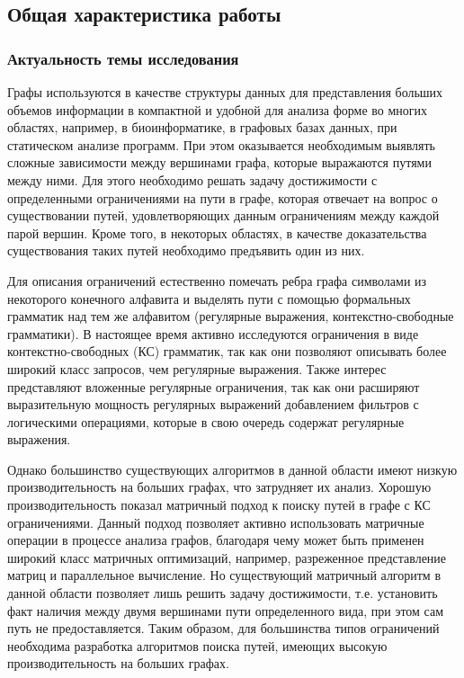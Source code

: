 \subsection*{\Large Общая характеристика работы}
\fontsize{14pt}{15pt}\selectfont
\subsubsection*{\large{Актуальность темы исследования}}
Графы используются в качестве структуры данных для представления больших объемов информации в компактной и удобной для анализа форме во многих областях, например, в биоинформатике, в графовых базах данных, при статическом анализе программ. При этом оказывается необходимым выявлять сложные зависимости между вершинами графа, которые выражаются путями между ними. Для этого необходимо решать задачу достижимости с определенными ограничениями на пути в графе, которая отвечает на вопрос о существовании путей, удовлетворяющих данным ограничениям между каждой парой вершин. Кроме того, в некоторых областях, в качестве доказательства существования таких путей необходимо предъявить один из них. 


Для описания ограничений естественно помечать ребра графа символами из некоторого конечного алфавита и выделять пути с помощью формальных грамматик над тем же алфавитом (регулярные выражения, контекстно-свободные грамматики). В настоящее время активно исследуются ограничения в виде контекстно-свободных (КС) грамматик, так как они позволяют описывать более широкий класс запросов, чем регулярные выражения. Также интерес представляют вложенные регулярные ограничения, так как они расширяют выразительную мощность регулярных выражений добавлением фильтров с логическими операциями, которые в свою очередь содержат регулярные выражения.

Однако большинство существующих алгоритмов в данной области имеют низкую производительность на больших графах, что затрудняет их анализ. Хорошую производительность показал матричный подход к поиску путей в графе с КС ограничениями. Данный подход позволяет активно использовать матричные операции в процессе анализа графов, благодаря чему может быть применен широкий класс матричных оптимизаций, например, разреженное представление матриц и параллельное вычисление. Но существующий матричный алгоритм в данной области позволяет лишь решить задачу достижимости, т.е. установить факт наличия между двумя вершинами пути определенного вида, при этом сам путь не предоставляется. Таким образом, для большинства типов ограничений необходима разработка алгоритмов поиска путей, имеющих высокую производительность на больших графах.



